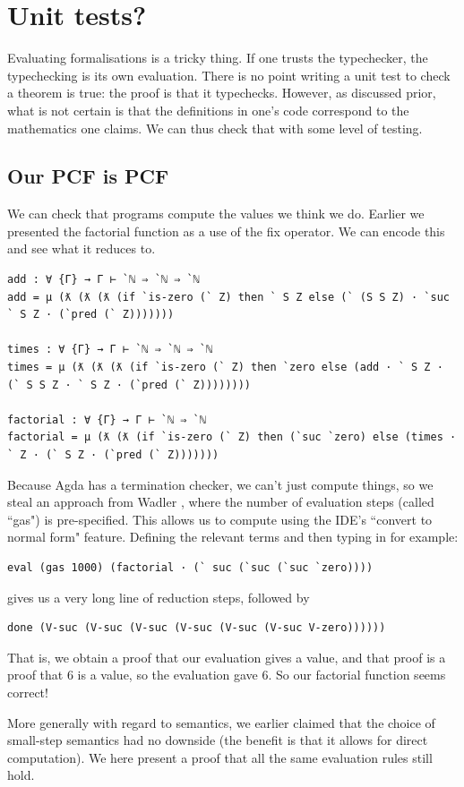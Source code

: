 \documentclass[12pt,a4paper,twoside,openright]{report}
\begin{document}
\section{Unit tests?}
Evaluating formalisations is a tricky thing. If one trusts the typechecker, the typechecking is its own evaluation. There is no point writing a unit test to check a theorem is true: the proof is that it typechecks. However, as discussed prior, what is not certain is that the definitions in one's code correspond to the mathematics one claims. We can thus check that with some level of testing. 
\subsection{Our PCF is PCF}
We can check that programs compute the values we think we do. Earlier we presented the factorial function as a use of the fix operator. We can encode this and see what it reduces to. 
\begin{verbatim}
add : ∀ {Γ} → Γ ⊢ `ℕ ⇒ `ℕ ⇒ `ℕ
add = μ (ƛ (ƛ (ƛ (if `is-zero (` Z) then ` S Z else (` (S S Z) · `suc ` S Z · (`pred (` Z)))))))

times : ∀ {Γ} → Γ ⊢ `ℕ ⇒ `ℕ ⇒ `ℕ
times = μ (ƛ (ƛ (ƛ (if `is-zero (` Z) then `zero else (add · ` S Z · (` S S Z · ` S Z · (`pred (` Z))))))))

factorial : ∀ {Γ} → Γ ⊢ `ℕ ⇒ `ℕ
factorial = μ (ƛ (ƛ (if `is-zero (` Z) then (`suc `zero) else (times · ` Z · (` S Z · (`pred (` Z)))))))
\end{verbatim}
Because Agda has a termination checker, we can't just compute things, so we steal an approach from Wadler \cite{PLFA}, where the number of evaluation steps (called ``gas") is pre-specified. This allows us to compute using the IDE's ``convert to normal form" feature. Defining the relevant terms and then typing in for example:
\begin{verbatim}
eval (gas 1000) (factorial · (` suc (`suc (`suc `zero))))
\end{verbatim}
gives us a very long line of reduction steps, followed by 
\begin{verbatim}
done (V-suc (V-suc (V-suc (V-suc (V-suc (V-suc V-zero))))))
\end{verbatim}
That is, we obtain a proof that our evaluation gives a value, and that proof is a proof that 6 is a value, so the evaluation gave 6. So our factorial function seems correct!

More generally with regard to semantics, we earlier claimed that the choice of small-step semantics had no downside (the benefit is that it allows for direct computation). We here present a proof that all the same evaluation rules still hold.
\end{document}
